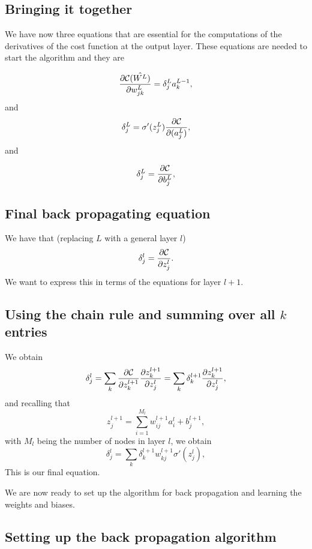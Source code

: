 \documentclass[%
oneside,                 %
final,                   %
10pt]{article}
\begin{document}
\subsection{Bringing it together}

We have now three equations that are essential for the computations of the derivatives of the cost function at the output layer. These equations are needed to start the algorithm and they are

\begin{equation}
\frac{\partial{\cal C}(\hat{W^L})}{\partial w_{jk}^L}  =  \delta_j^La_k^{L-1},
\end{equation}
and
\begin{equation}
\delta_j^L = \sigma'(z_j^L)\frac{\partial {\cal C}}{\partial (a_j^L)},
\end{equation}
and

\begin{equation}
\delta_j^L = \frac{\partial {\cal C}}{\partial b_j^L},
\end{equation}

\subsection{Final back propagating equation}

We have that (replacing $L$ with a general layer $l$)
\[
\delta_j^l =\frac{\partial {\cal C}}{\partial z_j^l}.
\]
We want to express this in terms of the equations for layer $l+1$.

\subsection{Using the chain rule and summing over all $k$ entries}

We obtain
\[
\delta_j^l =\sum_k \frac{\partial {\cal C}}{\partial z_k^{l+1}}\frac{\partial z_k^{l+1}}{\partial z_j^{l}}=\sum_k \delta_k^{l+1}\frac{\partial z_k^{l+1}}{\partial z_j^{l}},
\]
and recalling that
\[
z_j^{l+1} = \sum_{i=1}^{M_{l}}w_{ij}^{l+1}a_i^{l}+b_j^{l+1},
\]
with $M_l$ being the number of nodes in layer $l$, we obtain
\[
\delta_j^l =\sum_k \delta_k^{l+1}w_{kj}^{l+1}\sigma'(z_j^l),
\]
This is our final equation.

We are now ready to set up the algorithm for back propagation and learning the weights and biases.

\subsection{Setting up the back propagation algorithm}
\end{document}
